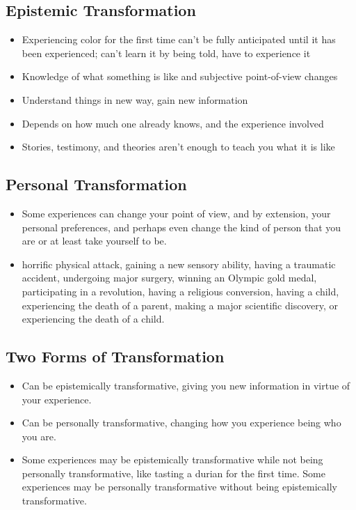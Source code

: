 \documentclass[
  .7em,
  letterpaper,
  DIV=11,
  numbers=noendperiod]{scrartcl}
\providecommand{\tightlist}{%
  \setlength{\itemsep}{0pt}\setlength{\parskip}{0pt}}\usepackage{longtable,booktabs,array}
\begin{document}
\hypertarget{epistemic-transformation}{%
\subsection{Epistemic Transformation}\label{epistemic-transformation}}

\begin{itemize}
\item
  Experiencing color for the first time can't be fully anticipated until
  it has been experienced; can't learn it by being told, have to
  experience it
\item
  Knowledge of what something is like and subjective point-of-view
  changes
\item
  Understand things in new way, gain new information
\item
  Depends on how much one already knows, and the experience involved
\item
  Stories, testimony, and theories aren't enough to teach you what it is
  like
\end{itemize}

\hypertarget{personal-transformation}{%
\subsection{Personal Transformation}\label{personal-transformation}}

\begin{itemize}
\item
  Some experiences can change your point of view, and by extension, your
  personal preferences, and perhaps even change the kind of person that
  you are or at least take yourself to be.
\item
  horrific physical attack, gaining a new sensory ability, having a
  traumatic accident, undergoing major surgery, winning an Olympic gold
  medal, participating in a revolution, having a religious conversion,
  having a child, experiencing the death of a parent, making a major
  scientific discovery, or experiencing the death of a child.
\end{itemize}

\hypertarget{two-forms-of-transformation}{%
\subsection{Two Forms of
Transformation}\label{two-forms-of-transformation}}

\begin{itemize}
\tightlist
\item
  Can be epistemically transformative, giving you new information in
  virtue of your experience.
\item
  Can be personally transformative, changing how you experience being
  who you are.
\item
  Some experiences may be epistemically transformative while not being
  personally transformative, like tasting a durian for the first time.
  Some experiences may be personally transformative without being
  epistemically transformative.
\end{itemize}
\end{document}
